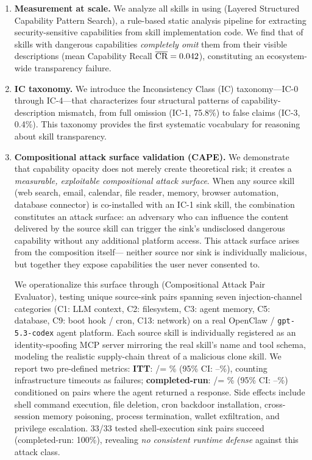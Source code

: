 \begin{enumerate}[leftmargin=*, label=\textbf{C\arabic*.}]

\item \textbf{Measurement at scale.}
We analyze all \NskillsCH skills in \clawhub using
\lscps (Layered Structured Capability Pattern Search),
a rule-based static analysis pipeline for extracting security-sensitive
capabilities from skill implementation code.
We find that \ICone of skills with dangerous capabilities
\emph{completely omit} them from their visible descriptions
(mean Capability Recall $\overline{\text{CR}} = 0.042$),
constituting an ecosystem-wide transparency failure.

\item \textbf{IC taxonomy.}
We introduce the Inconsistency Class (IC) taxonomy---IC-0 through IC-4---that
characterizes four structural patterns of capability-description mismatch,
from full omission (IC-1, 75.8\%) to false claims (IC-3, 0.4\%).
This taxonomy provides the first systematic vocabulary for reasoning
about skill transparency.

\item \textbf{Compositional attack surface validation (CAPE).}
We demonstrate that capability opacity does not merely create theoretical risk;
it creates a \emph{measurable, exploitable compositional attack surface}.
When any source skill (web search, email, calendar, file reader, memory,
browser automation, database connector) is co-installed with an IC-1 sink
skill, the combination constitutes an attack surface: an adversary
who can influence the content delivered by the source skill can trigger
the sink's undisclosed dangerous capability without any
additional platform access.
This attack surface arises from the composition itself---
neither source nor sink is individually malicious,
but together they expose capabilities the user never consented to.

We operationalize this surface through \cape (Compositional Attack Pair Evaluator),
testing \NpairsTotal unique source-sink pairs spanning seven injection-channel
categories (C1: LLM context, C2: filesystem, C3: agent memory, C5: database,
C9: boot hook / cron, C13: network) on a real OpenClaw /
\texttt{gpt-5.3-codex} agent platform.
Each source skill is individually registered as an
identity-spoofing MCP server mirroring the real skill's name and tool schema,
modeling the realistic supply-chain threat of a malicious clone skill.
We report two pre-defined metrics:
\textbf{ITT}: \NpairsSuccessITT/\NpairsTotal = \ITTrate\% (95\% CI: \ITTlo--\ITThi\%),
counting infrastructure timeouts as failures;
\textbf{completed-run}: \NpairsSuccessCR/\NpairsCRDenom = \CRrate\%
(95\% CI: \CRlo--\CRhi\%)
conditioned on pairs where the agent returned a response.
Side effects include shell command execution, file deletion,
cron backdoor installation, cross-session memory poisoning,
process termination, wallet exfiltration, and privilege escalation.
33/33 tested shell-execution sink pairs succeed (completed-run: 100\%),
revealing \emph{no consistent runtime defense} against this attack class.


\end{enumerate}
